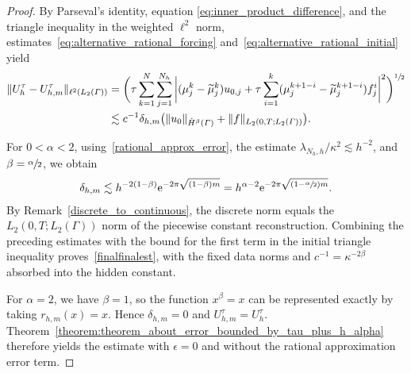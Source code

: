 \documentclass[numbers,webpdf]{ima-authoring-template}%
\theoremstyle{thmstyletwo}%
\numberwithin{equation}{section}
\begin{document}
\begin{proof}
    By Parseval's identity, equation \eqref{eq:inner_product_difference}, and the triangle inequality in the weighted $\ell^2$ norm, estimates~\eqref{eq:alternative_rational_forcing} and~\eqref{eq:alternative_rational_initial} yield
    \begin{align*}
        \|U_h^\tau-U_{h,m}^\tau\|_{\ell^2(L_2({\mit\varGamma}))}&=\bigg(\tau\sum_{k=1}^N\sum_{j=1}^{N_h}\bigg|( \mu_j^k-\widetilde \mu_j^k)u_{0,j}+\tau\sum_{i=1}^k( \mu_j^{k+1-i}-\widetilde \mu_j^{k+1-i})f_j^i\bigg|^2\bigg)^{\sfrac12}\\
        &\lesssim c^{-1}\delta_{h,m}\big(\|u_0\|_{\dot H^\beta({\mit\varGamma})}+\|f\|_{L_2(0,T;L_2({\mit\varGamma}))}\big).
\end{align*}

For $0<\alpha<2$, using~\eqref{rational_approx_error}, the estimate $\lambda_{N_h,h}/\kappa^2\lesssim h^{-2}$, and $\beta=\sfrac{\alpha}{2}$, we obtain
\begin{align*}
    \delta_{h,m} \lesssim h^{-2(1-\beta)} \mathrm{e}^{-2\pi\sqrt{(1-\beta)m}} =h^{\alpha-2} \mathrm{e}^{-2\pi\sqrt{(1-\sfrac{\alpha}{2})m}}.
\end{align*}
By Remark~\ref{discrete_to_continuous}, the discrete norm equals the $L_2(0,T;L_2(\Gamma))$ norm of the piecewise constant reconstruction. Combining the preceding estimates with the bound for the first term in the initial triangle inequality proves~\eqref{finalfinalest}, with the fixed data norms and $c^{-1}=\kappa^{-2\beta}$ absorbed into the hidden constant.

For $\alpha=2$, we have $\beta=1$, so the function $x^\beta=x$ can be represented exactly by taking $r_{h,m}(x)=x$. Hence $\delta_{h,m}=0$ and $U_{h,m}^\tau=U_h^\tau$. Theorem~\ref{theorem:theorem_about_error_bounded_by_tau_plus_h_alpha} therefore yields the estimate with $\epsilon=0$ and without the rational approximation error term.
\hfill
\end{proof}
\end{document}
